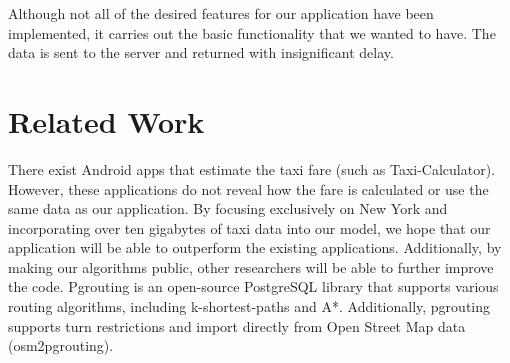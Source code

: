 \documentclass{sig-alternate}
\begin{document}
Although not all of the desired features for our application have been implemented, it carries out the basic functionality that we wanted to have.  The data is sent to the server and returned with insignificant delay.

\section{Related Work}
There exist Android apps that estimate the taxi fare (such as Taxi-Calculator). However, these applications do not reveal how the fare is calculated or use the same data as our application. By focusing exclusively on New York and incorporating over ten gigabytes of taxi data into our model, we hope that our application will be able to outperform the existing applications. Additionally, by making our algorithms public, other researchers will be able to further improve the code.
Pgrouting is an open-source PostgreSQL library that supports various routing algorithms, including k-shortest-paths and A*. Additionally, pgrouting supports turn restrictions and import directly from Open Street Map data (osm2pgrouting).
\end{document}
